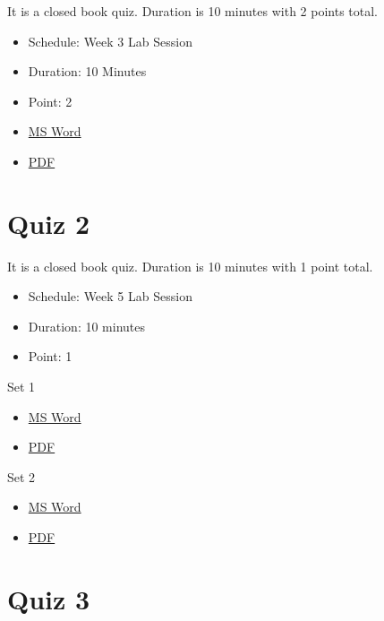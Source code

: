It is a closed book quiz. Duration is 10 minutes with 2 points total.

\begin{itemize}

\item
  Schedule: Week 3 Lab Session
\item
  Duration: 10 Minutes
\item
  Point: 2
\item
  \href{https://drive.google.com/open?id=0B88HKpainTSfTXJBU0RuYkV5c2s}{MS
  Word}
\item
  \href{https://drive.google.com/open?id=0B88HKpainTSfTDNrNjJIZ3VvQUE}{PDF}
\end{itemize}

\section{Quiz 2}\label{quiz-2}

It is a closed book quiz. Duration is 10 minutes with 1 point total.

\begin{itemize}

\item
  Schedule: Week 5 Lab Session
\item
  Duration: 10 minutes
\item
  Point: 1
\end{itemize}

Set 1

\begin{itemize}

\item
  \href{https://drive.google.com/open?id=0B88HKpainTSfRUNCdnVxLXY2Tjg}{MS
  Word}
\item
  \href{https://drive.google.com/open?id=0B88HKpainTSfekJpWTJBZ0J4RFU}{PDF}
\end{itemize}

Set 2

\begin{itemize}

\item
  \href{https://drive.google.com/open?id=0B88HKpainTSfeWpUQUJsTUdFSVE}{MS
  Word}
\item
  \href{https://drive.google.com/open?id=0B88HKpainTSfMjRLTHdmSjJVelE}{PDF}
\end{itemize}

\section{Quiz 3}\label{quiz-3}

